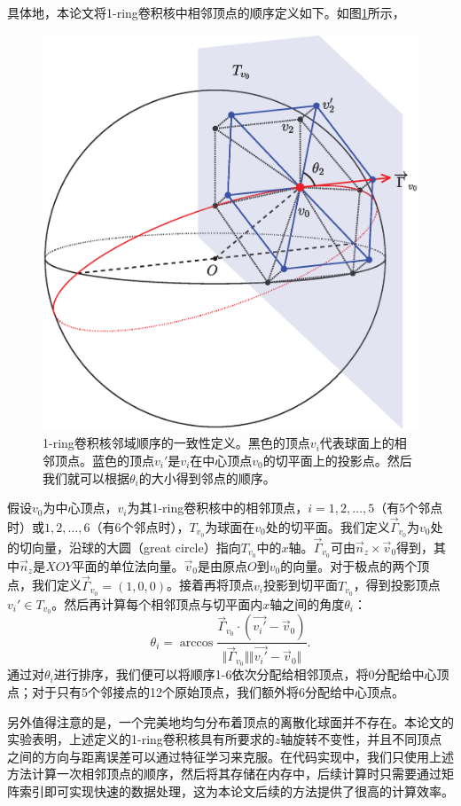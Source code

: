 具体地，本论文将1-ring卷积核中相邻顶点的顺序定义如下。如图\ref{fig:figure_1_ring_projection_on_tangent_plane}所示，
\begin{figure}[h]
	\centering
	\includegraphics[width=0.5\linewidth]{figure/figure_1_ring_projection_on_tangent_plane.eps}
	\caption{1-ring卷积核邻域顺序的一致性定义。黑色的顶点$v_i$代表球面上的相邻顶点。蓝色的顶点$v_i'$是$v_i$在中心顶点$v_0$的切平面上的投影点。然后我们就可以根据$\theta_i$的大小得到邻点的顺序。}
	\label{fig:figure_1_ring_projection_on_tangent_plane}
\end{figure}
假设$v_0$为中心顶点，$v_i$为其1-ring卷积核中的相邻顶点，$i=1,2,\dots,5$（有5个邻点时）或$1,2,\dots,6$（有6个邻点时），$T_{v_0}$为球面在$v_0$处的切平面。我们定义$\vec{\Gamma}_{v_0}$为$v_0$处的切向量，沿球的大圆（great circle）指向$T_{v_0}$中的$x$轴。$\vec{\Gamma}_{v_0}$可由$\vec{n}_z\times \vec{v}_0$得到，其中$\vec{n}_z$是$XOY$平面的单位法向量。$\vec{v}_0$是由原点$O$到$v_0$的向量。对于极点的两个顶点，我们定义$\vec{\Gamma}_{v_0}=(1,0,0)$。接着再将顶点$v_i$投影到切平面$T_{v_0}$，得到投影顶点$v_i'\in T_{v_0}$。然后再计算每个相邻顶点与切平面内$x$轴之间的角度$\theta_i$：
\begin{equation}
\theta_i=\arccos{\frac{\vec{\Gamma}_{v_0} \cdot (\vec{v_i'}-\vec{v}_0)}{\Vert{\vec{\Gamma}_{v_0}}\Vert\Vert{\vec{v_i'}-\vec{v}_0}\Vert}}.
\end{equation}
通过对$\theta_i$进行排序，我们便可以将顺序1-6依次分配给相邻顶点，将0分配给中心顶点；对于只有5个邻接点的12个原始顶点，我们额外将6分配给中心顶点。

另外值得注意的是，一个完美地均匀分布着顶点的离散化球面并不存在\cite{lee2019spherephd}。本论文的实验表明，上述定义的1-ring卷积核具有所要求的$z$轴旋转不变性，并且不同顶点之间的方向与距离误差可以通过特征学习来克服\cite{lee2019spherephd,liu2018deep,zhao2019spherical_ipmi,jiang2018spherical}。在代码实现中，我们只使用上述方法计算一次相邻顶点的顺序，然后将其存储在内存中，后续计算时只需要通过矩阵索引即可实现快速的数据处理，这为本论文后续的方法提供了很高的计算效率。

